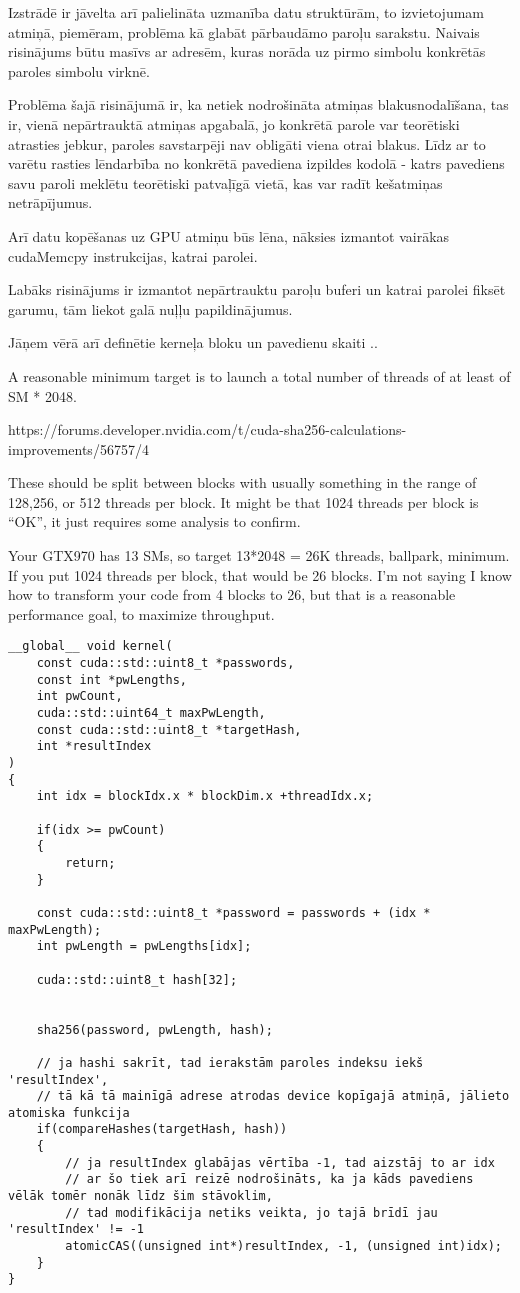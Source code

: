 \documentclass[12pt]{report}%
\theoremstyle{definition}
\begin{document}
Izstrādē ir jāvelta arī palielināta uzmanība datu struktūrām, to izvietojumam atmiņā, piemēram,
problēma kā glabāt pārbaudāmo paroļu sarakstu. Naivais risinājums būtu masīvs ar adresēm, kuras norāda uz pirmo simbolu konkrētās paroles simbolu virknē.

Problēma šajā risinājumā ir, ka netiek nodrošināta atmiņas blakusnodalīšana, tas ir, vienā nepārtrauktā atmiņas
apgabalā, jo konkrētā parole var teorētiski atrasties jebkur, paroles savstarpēji nav obligāti viena otrai
blakus. Līdz ar to varētu rasties lēndarbība no konkrētā pavediena izpildes kodolā - katrs pavediens savu
paroli meklētu teorētiski patvaļīgā vietā, kas var radīt kešatmiņas netrāpījumus.


Arī datu kopēšanas uz GPU atmiņu būs lēna, nāksies izmantot vairākas cudaMemcpy instrukcijas, katrai parolei.

Labāks risinājums ir izmantot nepārtrauktu paroļu buferi un katrai parolei fiksēt garumu, tām liekot galā 
nuļļu papildinājumus.


Jāņem vērā arī definētie kerneļa bloku un pavedienu skaiti ..

A reasonable minimum target is to launch a total number of threads of at least of SM * 2048.

https://forums.developer.nvidia.com/t/cuda-sha256-calculations-improvements/56757/4

These should be split between blocks with usually something in the range of 128,256, or 512 threads per block. It might be that 1024 threads per block is “OK”, it just requires some analysis to confirm.

Your GTX970 has 13 SMs, so target 13*2048 = 26K threads, ballpark, minimum. If you put 1024 threads per block, that would be 26 blocks. I’m not saying I know how to transform your code from 4 blocks to 26, but that is a reasonable performance goal, to maximize throughput.

\begin{lstlisting}
__global__ void kernel(
    const cuda::std::uint8_t *passwords,
    const int *pwLengths,
    int pwCount,
    cuda::std::uint64_t maxPwLength,
    const cuda::std::uint8_t *targetHash,
    int *resultIndex
)
{
    int idx = blockIdx.x * blockDim.x +threadIdx.x;

    if(idx >= pwCount)
    {
        return;
    }

    const cuda::std::uint8_t *password = passwords + (idx * maxPwLength);
    int pwLength = pwLengths[idx];

    cuda::std::uint8_t hash[32];


    sha256(password, pwLength, hash);

    // ja hashi sakrīt, tad ierakstām paroles indeksu iekš 'resultIndex',
    // tā kā tā mainīgā adrese atrodas device kopīgajā atmiņā, jālieto atomiska funkcija
    if(compareHashes(targetHash, hash))
    {
        // ja resultIndex glabājas vērtība -1, tad aizstāj to ar idx
        // ar šo tiek arī reizē nodrošināts, ka ja kāds pavediens vēlāk tomēr nonāk līdz šim stāvoklim,
        // tad modifikācija netiks veikta, jo tajā brīdī jau 'resultIndex' != -1
        atomicCAS((unsigned int*)resultIndex, -1, (unsigned int)idx);
    }
}
\end{lstlisting}
\end{document}
